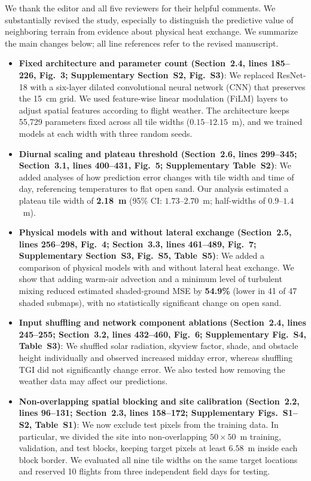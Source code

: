 \documentclass[12pt,english]{reviewresponse}
\begin{document}
We thank the editor and all five reviewers for their helpful comments. We substantially revised the study, especially to distinguish the predictive value of neighboring terrain from evidence about physical heat exchange. We summarize the main changes below; all line references refer to the revised manuscript.
\begin{itemize}[leftmargin=*, itemsep=0.2em]
    \item \textbf{Fixed architecture and parameter count (Section~2.4, lines 185--226, Fig.~3; Supplementary Section~S2, Fig.~S3)}: We replaced ResNet-18 with a six-layer dilated convolutional neural network (CNN) that preserves the 15~cm grid. We used feature-wise linear modulation (FiLM) layers to adjust spatial features according to flight weather. The architecture keeps 55,729 parameters fixed across all tile widths ($0.15\text{--}12.15$~m), and we trained models at each width with three random seeds.
    \item \textbf{Diurnal scaling and plateau threshold (Section~2.6, lines 299--345; Section~3.1, lines 400--431, Fig.~5; Supplementary Table~S2)}: We added analyses of how prediction error changes with tile width and time of day, referencing temperatures to flat open sand. Our analysis estimated a plateau tile width of \textbf{2.18~m} (95\% CI: $1.73\text{--}2.70$~m; half-widths of $0.9\text{--}1.4$~m). 
    \item \textbf{Physical models with and without lateral exchange (Section~2.5, lines 256--298, Fig.~4; Section~3.3, lines 461--489, Fig.~7; Supplementary Section~S3, Fig.~S5, Table~S5)}: We added a comparison of physical models with and without lateral heat exchange. We show that adding warm-air advection and a minimum level of turbulent mixing reduced estimated shaded-ground MSE by \textbf{54.9\%} (lower in 41 of 47 shaded submaps), with no statistically significant change on open sand.
    \item \textbf{Input shuffling and network component ablations (Section~2.4, lines 245--255; Section~3.2, lines 432--460, Fig.~6; Supplementary Fig.~S4, Table~S3)}: We shuffled solar radiation, skyview factor, shade, and obstacle height individually and observed increased midday error, whereas shuffling TGI did not significantly change error. We also tested how removing the weather data may affect our predictions. 
    \item \textbf{Non-overlapping spatial blocking and site calibration (Section~2.2, lines 96--131; Section~2.3, lines 158--172; Supplementary Figs.~S1--S2, Table~S1)}: We now exclude test pixels from the training data. In particular, we divided the site into non-overlapping $50\times 50$~m training, validation, and test blocks, keeping target pixels at least $6.58$~m inside each block border. We evaluated all nine tile widths on the same target locations and reserved 10 flights from three independent field days for testing.
\end{itemize}
\clearpage
\end{document}
